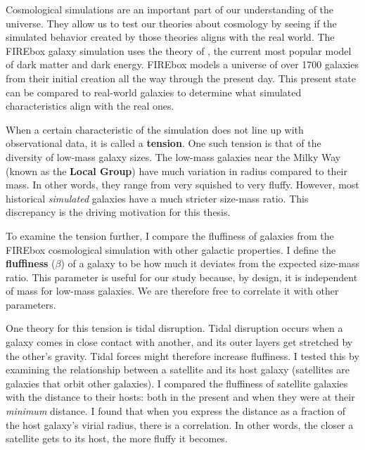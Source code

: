 
Cosmological simulations are an important part of our understanding of the universe. They allow us to test our theories about cosmology by seeing if the simulated behavior created by those theories aligns with the real world. The FIREbox galaxy simulation uses the theory of \textbf{\lcdm}, the current most popular model of dark matter and dark energy. FIREbox models a universe of over 1700 galaxies from their initial creation all the way through the present day. This present state can be compared to real-world galaxies to determine what simulated characteristics align with the real ones.

When a certain characteristic of the simulation does not line up with observational data, it is called a \textbf{tension}. One such tension is that of the diversity of low-mass galaxy sizes. The low-mass galaxies near the Milky Way (known as the \textbf{Local Group}) have much variation in radius compared to their mass. In other words, they range from very squished to very fluffy. However, most historical \emph{simulated} galaxies have a much stricter size-mass ratio. This discrepancy is the driving motivation for this thesis.

To examine the tension further, I compare the fluffiness of galaxies from the FIREbox cosmological simulation with other galactic properties. I define the \textbf{fluffiness} ($\beta$) of a galaxy to be how much it deviates from the expected size-mass ratio. This parameter is useful for our study because, by design, it is independent of mass for low-mass galaxies. We are therefore free to correlate it with other parameters.

One theory for this tension is tidal disruption. Tidal disruption occurs when a galaxy comes in close contact with another, and its outer layers get stretched by the other's gravity. Tidal forces might therefore increase fluffiness. I tested this by examining the relationship between a satellite and its host galaxy (satellites are galaxies that orbit other galaxies). I compared the fluffiness of satellite galaxies with the distance to their hosts: both in the present and when they were at their \emph{minimum} distance. I found that when you express the distance as a fraction of the host galaxy's virial radius, there is a correlation. In other words, the closer a satellite gets to its host, the more fluffy it becomes.